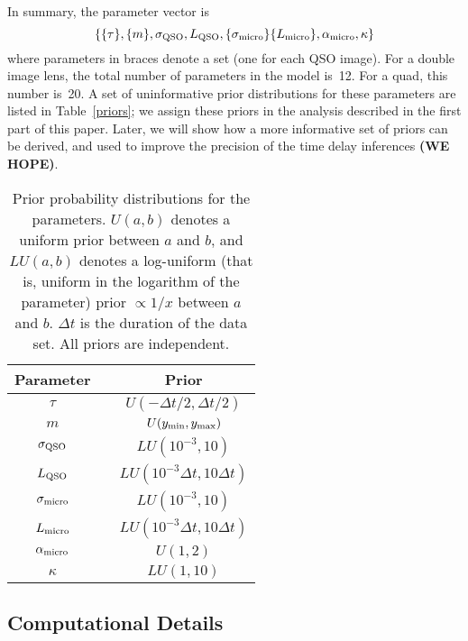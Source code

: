 \documentclass[useAMS,usenatbib, a4paper]{mn2e} \usepackage{natbib}
\begin{document}
In summary, the parameter vector is
\begin{equation}
\left\{ \{\tau\}, \{m\}, \sigma_{\rm QSO}, L_{\rm QSO}, \{\sigma_{\rm micro}\}
\{L_{\rm micro}\}, \alpha_{\rm micro}, \kappa \right\}
\end{equation}
where parameters in braces denote a set (one for each QSO image).  For a
double image lens, the total number of parameters in the model is~12. For a
quad, this number is~20. A set of uninformative prior
distributions for these parameters are listed in Table~\ref{priors}; we assign
these priors in the analysis described in the first part of this paper. Later,
we will show how a more informative set of priors can be derived, and used to
improve the precision of the time delay inferences {\bf (WE HOPE)}.

\begin{table}
\begin{center}
\begin{tabular}{ccc}
Parameter & \vline & Prior \\
\hline
$\tau$ & \vline & $U(-\Delta t/2, \Delta t/2)$ \\ 
$m$ & \vline & $U(y_{\rm min}, y_{\rm max})$ \\
$\sigma_{\rm QSO}$ & \vline & $LU(10^{-3}, 10)$ \\
$L_{\rm QSO}$ & \vline & $LU(10^{-3}\Delta t, 10\Delta t)$ \\
$\sigma_{\rm micro}$ & \vline & $LU(10^{-3}, 10)$ \\
$L_{\rm micro}$ & \vline & $LU(10^{-3}\Delta t, 10\Delta t)$ \\
$\alpha_{\rm micro}$ & \vline & $U(1, 2)$ \\
$\kappa$ & \vline & $LU(1, 10)$
\end{tabular}
\end{center}
\caption{Prior probability distributions for the parameters. $U(a, b)$ denotes
a uniform prior between $a$ and $b$, and $LU(a, b)$ denotes a log-uniform
(that is, uniform in the logarithm of the parameter) prior $\propto 1/x$
between $a$ and $b$. $\Delta t$ is the duration of the data set. All priors
are independent.\label{tab:prior}}
\end{table}


\subsection{Computational Details}
\end{document}
